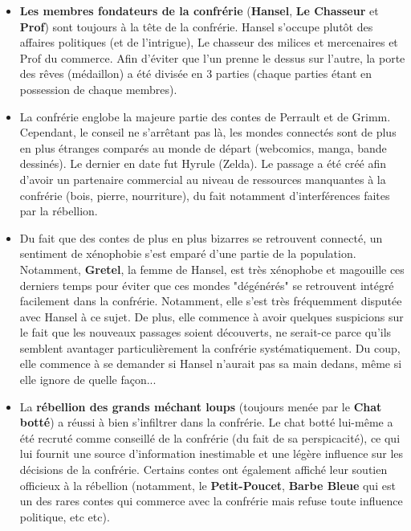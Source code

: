{\begin{itemize}
		\item \textbf{Les membres fondateurs de la confrérie} (\textbf{Hansel}, \textbf{Le Chasseur} et \textbf{Prof}) sont toujours à la tête de la confrérie. Hansel s'occupe plutôt des affaires politiques (et de l'intrigue), Le chasseur des milices et mercenaires et Prof du commerce. Afin d'éviter que l'un prenne le dessus sur l'autre, la porte des rêves (médaillon) a été divisée en 3 parties (chaque parties étant en possession de chaque membres).
		\item La confrérie englobe la majeure partie des contes de Perrault et de Grimm. Cependant, le conseil ne s'arrêtant pas là, les mondes connectés sont de plus en plus étranges comparés au monde de départ (webcomics, manga, bande dessinés). Le dernier en date fut Hyrule (Zelda). Le passage a été créé afin d'avoir un partenaire commercial au niveau de ressources manquantes à la confrérie (bois, pierre, nourriture), du fait notamment d'interférences faites par la rébellion.
		
		\item Du fait que des contes de plus en plus bizarres se retrouvent connecté, un sentiment de xénophobie s'est emparé d'une partie de la population. Notamment, \textbf{Gretel}, la femme de Hansel, est très xénophobe et magouille ces derniers temps pour éviter que ces mondes "dégénérés" se retrouvent intégré facilement dans la confrérie. Notamment, elle s'est très fréquemment disputée avec Hansel à ce sujet. De plus, elle commence à avoir quelques suspicions sur le fait que les nouveaux passages soient découverts, ne serait-ce parce qu'ils semblent avantager particulièrement la confrérie systématiquement. Du coup, elle commence à se demander si Hansel n'aurait pas sa main dedans, même si elle ignore de quelle façon...
		
		\item La \textbf{rébellion des grands méchant loups} (toujours menée par le \textbf{Chat botté}) a réussi à bien s'infiltrer dans la confrérie. Le chat botté lui-même a été recruté comme conseillé de la confrérie (du fait de sa perspicacité), ce qui lui fournit une source d'information inestimable et une légère influence sur les décisions de la confrérie. Certains contes ont également affiché leur soutien officieux à la rébellion (notamment, le \textbf{Petit-Poucet}, \textbf{Barbe Bleue} qui est un des rares contes qui commerce avec la confrérie mais refuse toute influence politique, etc etc).
		

\end{itemize}}
